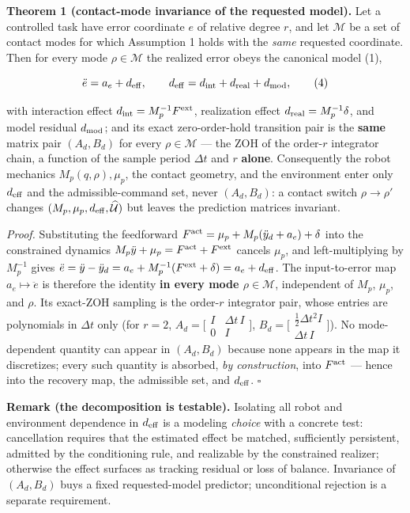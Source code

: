 \documentclass[journal]{IEEEtran}
\theoremstyle{plain}
\theoremstyle{definition}
\begin{document}
\textbf{Theorem 1 (contact-mode invariance of the requested model).} Let a controlled task have error coordinate \(e\) of relative degree \(r\), and let \(\mathcal M\) be a set of contact modes for which Assumption 1 holds with the \emph{same} requested coordinate. Then for every mode \(\rho\in\mathcal M\) the realized error obeys the canonical model (1),

\[
\ddot e=a_e+d_{\rm eff},\qquad
d_{\rm eff}=d_{\rm int}+d_{\rm real}+d_{\rm mod},
\tag{4}
\]

with interaction effect \(d_{\rm int}=M_p^{-1}F^{\rm ext}\), realization effect \(d_{\rm real}=M_p^{-1}\delta\), and model residual \(d_{\rm mod}\); and its exact zero-order-hold transition pair is the \textbf{same} matrix pair \((A_d,B_d)\) for every \(\rho\in\mathcal M\) --- the ZOH of the order-\(r\) integrator chain, a function of the sample period \(\Delta t\) and \(r\) \textbf{alone}. Consequently the robot mechanics \(M_p(q,\rho),\mu_p\), the contact geometry, and the environment enter only \(d_{\rm eff}\) and the admissible-command set, never \((A_d,B_d)\): a contact switch \(\rho\to\rho'\) changes \((M_p,\mu_p,d_{\rm eff},\widehat{\mathcal U})\) but leaves the prediction matrices invariant.

\emph{Proof.} Substituting the feedforward \(F^{\rm act}=\mu_p+M_p(\ddot y_d+a_e)+\delta\) into the constrained dynamics \(M_p\ddot y+\mu_p=F^{\rm act}+F^{\rm ext}\) cancels \(\mu_p\), and left-multiplying by \(M_p^{-1}\) gives \(\ddot e=\ddot y-\ddot y_d=a_e+M_p^{-1}(F^{\rm ext}+\delta)=a_e+d_{\rm eff}\). The input-to-error map \(a_e\mapsto\ddot e\) is therefore the identity \textbf{in every mode \(\rho\in\mathcal M\)}, independent of \(M_p\), \(\mu_p\), and \(\rho\). Its exact-ZOH sampling is the order-\(r\) integrator pair, whose entries are polynomials in \(\Delta t\) only (for \(r=2\), \(A_d=\big[\begin{smallmatrix}I&\Delta t\,I\\0&I\end{smallmatrix}\big]\), \(B_d=\big[\begin{smallmatrix}\frac12\Delta t^2I\\\Delta t\,I\end{smallmatrix}\big]\)). No mode-dependent quantity can appear in \((A_d,B_d)\) because none appears in the map it discretizes; every such quantity is absorbed, \emph{by construction}, into \(F^{\rm act}\) --- hence into the recovery map, the admissible set, and \(d_{\rm eff}\). \(\square\)

\textbf{Remark (the decomposition is testable).} Isolating all robot and environment dependence in \(d_{\rm eff}\) is a modeling \emph{choice} with a concrete test: cancellation requires that the estimated effect be matched, sufficiently persistent, admitted by the conditioning rule, and realizable by the constrained realizer; otherwise the effect surfaces as tracking residual or loss of balance. Invariance of \((A_d,B_d)\) buys a fixed requested-model predictor; unconditional rejection is a separate requirement.
\end{document}

